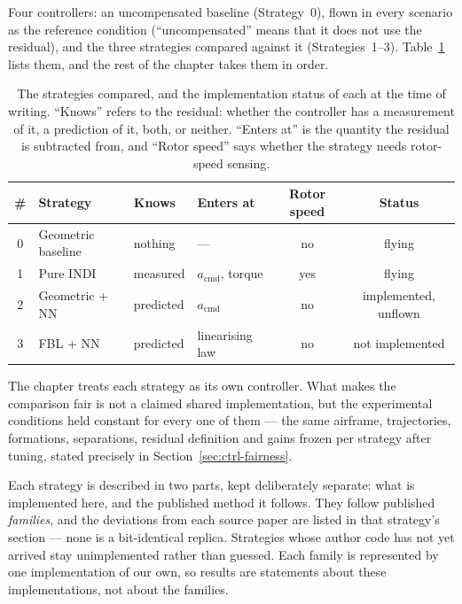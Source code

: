 Four controllers: an uncompensated baseline (Strategy~0), flown in every scenario as the
reference condition (``uncompensated'' means that it does not use the residual), and the three strategies compared against it (Strategies~1--3).
Table~\ref{tab:ctrl-summary} lists them, and the rest of the chapter takes them in order.

\begin{table}[t]
  \centering
  \caption{The strategies compared, and the implementation status of each at the time of writing.
    ``Knows'' refers to the residual: whether the controller has a measurement of it, a prediction
    of it, both, or neither. ``Enters at'' is the quantity the residual is subtracted from, and
    ``Rotor speed'' says whether the strategy needs rotor-speed sensing.}
  \label{tab:ctrl-summary}
  \small
  \begin{tabular}{@{}clllcc@{}}
    \toprule
    \# & Strategy & Knows & Enters at & Rotor speed & Status \\
    \midrule
    0 & Geometric baseline           & nothing    & ---                        & no  & flying \\
    1 & Pure INDI                    & measured   & $a_{\mathrm{cmd}}$, torque & yes & flying \\
    2 & Geometric + NN               & predicted  & $a_{\mathrm{cmd}}$         & no  & implemented, unflown \\
    3 & FBL + NN                     & predicted  & linearising law            & no  & not implemented \\
    \bottomrule
  \end{tabular}
\end{table}

The chapter treats each strategy as its own controller. What makes the comparison fair is not a
claimed shared implementation, but the experimental conditions held constant for every one of them — the same
airframe, trajectories, formations, separations, residual definition and gains frozen per strategy
after tuning, stated precisely in Section~\ref{sec:ctrl-fairness}.

Each strategy is described in two parts, kept deliberately separate: what is implemented here, and
the published method it follows. They follow published \emph{families}, and the deviations from
each source paper are listed in that strategy's section — none is a bit-identical replica.
Strategies whose author code has not yet arrived stay unimplemented rather than guessed. Each family
is represented by one implementation of our own, so results are statements about these
implementations, not about the families.

